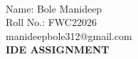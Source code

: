 \documentclass[10pt,a4paper]{report}
\begin{document}
 \vspace{3mm}\\ \raggedleft Name: Bole Manideep\vspace{2mm}\\ \raggedleft Roll No.: FWC22026\vspace{2mm}\\ \raggedleft manideepbole312@gmail.com \vspace{10mm}
\\ \centering \Large \textbf{IDE ASSIGNMENT} \normalsize \vspace{15mm}
\end{document}

